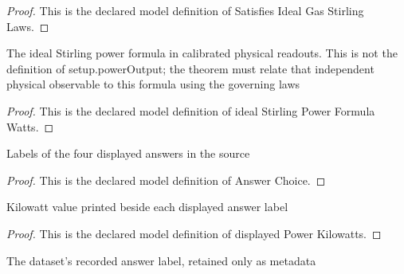 \begin{proof}
  This is the declared model definition of Satisfies Ideal Gas Stirling Laws.
\end{proof}
\begin{definition}
  \label{def:physics:phyx-mini-0355:phyxminiproblems-problemphyxmini0355-idealstirlingpowerformulawatts}
  The ideal Stirling power formula in calibrated physical readouts. This is not the definition of setup.powerOutput; the theorem must relate that independent physical observable to this formula using the governing laws
\end{definition}
\begin{proof}
  This is the declared model definition of ideal Stirling Power Formula Watts.
\end{proof}
\begin{definition}
  \label{def:physics:phyx-mini-0355:phyxminiproblems-problemphyxmini0355-answerchoice}
  Labels of the four displayed answers in the source
\end{definition}
\begin{proof}
  This is the declared model definition of Answer Choice.
\end{proof}
\begin{definition}
  \label{def:physics:phyx-mini-0355:phyxminiproblems-problemphyxmini0355-displayedpowerkilowatts}
  Kilowatt value printed beside each displayed answer label
\end{definition}
\begin{proof}
  This is the declared model definition of displayed Power Kilowatts.
\end{proof}
\begin{definition}
  \label{def:physics:phyx-mini-0355:phyxminiproblems-problemphyxmini0355-recordeddatasetanswer}
  The dataset's recorded answer label, retained only as metadata
\end{definition}

